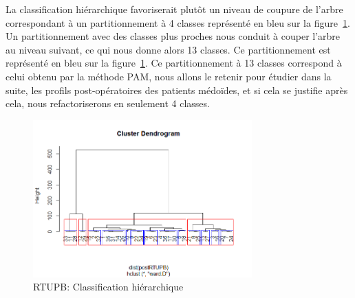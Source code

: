 La classification hiérarchique favoriserait plutôt un niveau de coupure de l'arbre correspondant à un partitionnement à 4 classes représenté en bleu sur la figure~\ref{fig-rtupb-post-cah}.
Un partitionnement avec des classes plus proches nous conduit à couper l'arbre au niveau suivant, ce qui
nous donne alors 13 classes. Ce partitionnement est représenté en bleu sur la figure~\ref{fig-rtupb-post-cah}.
Ce partitionnement à 13 classes correspond à celui obtenu par la méthode PAM, nous allons le retenir pour 
étudier dans la suite, les profils post-opératoires des patients médoïdes, et si cela se justifie après cela, nous refactoriserons en seulement 4 classes.

\begin{figure}[H]
\centering
\includegraphics[width=0.75\textwidth]{../Fig/RTUPB/rtupb-cah-k13-post.png}
\caption{RTUPB: Classification hiérarchique}
\label{fig-rtupb-post-cah}
\end{figure}


%
